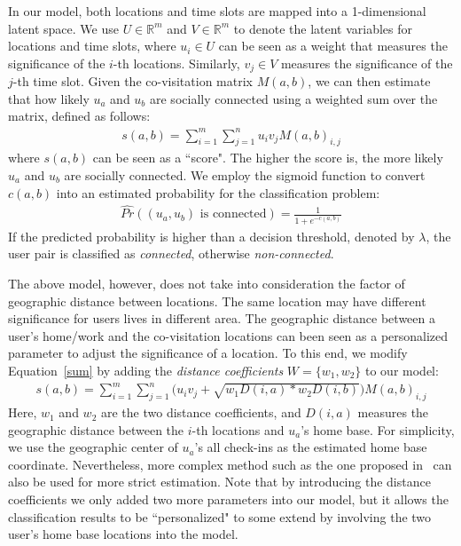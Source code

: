 In our model, both locations and time slots are mapped into a 1-dimensional latent space. We use $U \in \mathbb{R}^m$ and $V \in \mathbb{R}^m$ to denote the latent variables for locations and time slots, where $u_i \in U$ can be seen as a weight that measures the significance of the $i$-th locations. Similarly, $v_j \in V$ measures the significance of the $j$-th time slot. Given the co-visitation matrix $M(a,b)$, we can then estimate that how likely $u_a$ and $u_b$ are socially connected using a weighted sum over the matrix, defined as follows:
\begin{align}\label{sum}
s(a,b) = \sum_{i = 1} ^m \sum_{j=1}^n u_i v_j M(a,b)_{i,j}
\end{align}
where $s(a,b)$ can be seen as a ``score". The higher the score is, the more likely $u_a$ and $u_b$ are socially connected. We employ the sigmoid function to convert $c(a,b)$ into an estimated probability for the classification problem:
\begin{align}\label{sigmoid}
\hat{Pr}( (u_a, u_b)  \text{ is connected} ) = \frac{1}{1 + e^{-c(a,b)}}
\end{align}
If the predicted probability is higher than a decision threshold, denoted by $\lambda$, the user pair is classified as \textit{connected}, otherwise \textit{non-connected}.

The above model, however, does not take into consideration the factor of geographic distance between locations. The same location may have different significance for users lives in different area. The geographic distance between a user's home/work and the co-visitation locations can been seen as a personalized parameter to adjust the significance of a location. To this end, we modify Equation~\ref{sum} by adding the \textit{distance coefficients} $W = \{w_1, w_2\}$ to our model:
\begin{align}\label{sum2}
s(a,b) = \sum_{i = 1} ^m \sum_{j=1}^n \bigg( u_i v_j + \sqrt{w_1 D(i,a) * w_2 D(i,b)} \bigg) M(a,b)_{i,j} 
\end{align}
Here, $w_1$ and $w_2$ are the two distance coefficients, and $D(i,a)$ measures the geographic distance between the $i$-th locations and $u_a$'s home base. For simplicity, we use the geographic center of $u_a$'s all check-ins as the estimated home base coordinate. Nevertheless, more complex method such as the one proposed in~\cite{cho2011friendship} can also be used for more strict estimation. Note that by introducing the distance coefficients we only added two more parameters into our model, but it allows the classification results to be ``personalized" to some extend by involving the two user's home base locations into the model.


